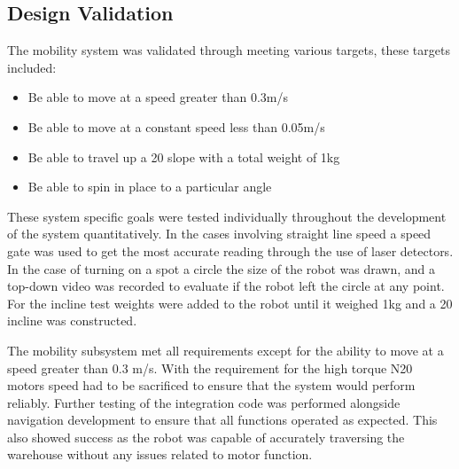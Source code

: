 \documentclass{article}
\begin{document}
\subsection{Design Validation}
The mobility system was validated through meeting various targets, these targets included:
\begin{itemize}
    \item Be able to move at a speed greater than 0.3m/s
    \item Be able to move at a constant speed less than 0.05m/s
    \item Be able to travel up a 20\textdegree{} slope with a total weight of 1kg
    \item Be able to spin in place to a particular angle
\end{itemize}
These system specific goals were tested individually throughout the development of the system quantitatively. In the cases involving straight line speed a speed gate was used
to get the most accurate reading through the use of laser detectors. In the case of turning on a spot a circle the size of the robot was drawn, and a top-down video was recorded
to evaluate if the robot left the circle at any point. For the incline test weights were added to the robot until it weighed 1kg and a 20\textdegree{} incline was constructed.
\par
The mobility subsystem met all requirements except for the ability to move at a speed greater than 0.3 m/s. With the requirement for the high torque N20 motors speed had to be
sacrificed to ensure that the system would perform reliably. Further testing of the integration code was performed alongside navigation development to ensure that all functions
operated as expected. This also showed success as the robot was capable of accurately traversing the warehouse without any issues related to motor function.
\par
\end{document}
